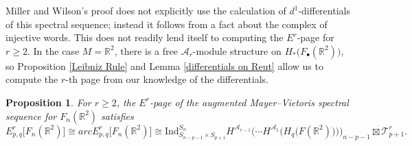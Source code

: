 \documentclass[pagebackref,colorlinks,citecolor=blue,linkcolor=blue,urlcolor=blue,filecolor=blue]{article}
\newtheorem{prop}[thm]{Proposition}
\theoremstyle{definition}\newtheorem{definition}[thm]{Definition}
\theoremstyle{definition}
\newcommand{\R}{\ensuremath{\mathbb{R}}}
\begin{document}
Miller and Wilson's proof does not explicitly use the calculation of $d^{1}$-differentials of this spectral sequence; instead it follows from a fact about the complex of injective words.
This does not readily lend itself to computing the $E^{r}$-page for $r\ge2$.
In the case $M=\R^{2}$, there is a free $\mathcal{A}_{r}$-module structure on $H_{*}\big(F_{\bullet}(\R^{2})\big)$, so Proposition \ref{Leibniz Rule} and Lemma \ref{differentials on Reut} allow us to compute the $r$-th page from our knowledge of the differentials.

\begin{prop}\label{Er page for FnR2}
For $r\ge 2$, the $E^{r}$-page of the augmented Mayer--Vietoris spectral sequence for $F_{n}(\R^{2})$ satisfies
\[
E^{r}_{p,q}\big[F_{n}(\R^{2})\big]\cong arcE^{r}_{p,q}\big[F_{n}(\R^{2})\big]\cong \text{Ind}^{S_{n}}_{S_{n-p-1}\times S_{p+1}}H^{\mathcal{A}_{r-1}}\bigg(\cdots H^{\mathcal{A}_{1}}\Big(H_{q}\big(F(\R^{2})\big)\Big)\bigg)_{n-p-1}\boxtimes \mathcal{T}^{r}_{p+1}.
\]
\end{prop}
\end{document}

